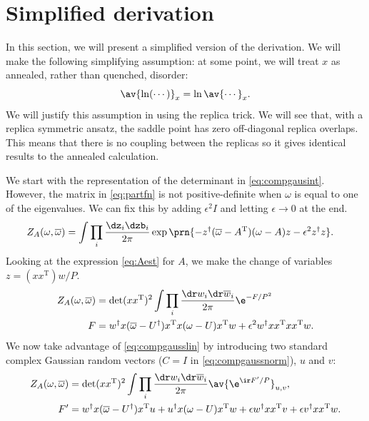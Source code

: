 \documentclass[12pt]{article}
\newcommand{\inv}{^{-1}}
\newcommand{\dg}{^\dagger}
\newcommand{\trans}{^\mathrm{T}}
\newcommand{\omb}{\overline{\omega}}
\newcommand{\dw}{\dr w}
\newcommand{\dwb}{\dr\overline{w}}
\begin{document}
\section{Simplified derivation}\label{sec:simplederiv}

In this section, we will present a simplified version of the derivation.
We will make the following simplifying assumption: at some point, we will treat $x$ as annealed, rather than quenched, disorder:
%
\begin{equation}\label{eq:annealed}
  \av{\ln (\cdots)}_x = \ln\av{\cdots}_x.
\end{equation}
%
We will justify this assumption in  using the replica trick.
We will see that, with a replica symmetric ansatz, the saddle point has zero off-diagonal replica overlaps.
This means that there is no coupling between the replicas so it gives identical results to the annealed calculation.

We start with the representation of the determinant in \eqref{eq:compgausint}.
However, the matrix in \eqref{eq:partfn} is not positive-definite when $\omega$ is equal to one of the eigenvalues.
We can fix this by adding $\epsilon^2I$ and letting $\epsilon\to0$ at the end.
%
\begin{equation}\label{eq:partfnintz}
\begin{aligned}
  Z_A(\omega,\omb) &= \int \prod_i\frac{\dz_i\dzb_i}{2\pi} \exp\prn{
    -z\dg (\omb-A\trans)(\omega-A) z - \epsilon^2 z\dg z} .%
\end{aligned}
\end{equation}
%
Looking at the expression \eqref{eq:Aest} for $A$, we make the change of variables $z=(xx\trans)w/P$.
%
\begin{equation}\label{eq:partfnintw}
\begin{aligned}
  Z_A(\omega,\omb) &= \det(xx\trans)^2 \int \prod_i\frac{\dw_i\dwb_i}{2\pi}\e^{-F/P^2}
    \\
  F &=
     w\dg x(\omb-U\dg)x\trans x(\omega-U)x\trans w + \epsilon^2 w\dg xx\trans xx\trans w .%
\end{aligned}
\end{equation}
%
We now take advantage of \eqref{eq:compgausslin} by introducing two standard complex Gaussian random vectors ($C=I$ in \eqref{eq:compgaussnorm}), $u$ and $v$:
%
\begin{equation}\label{eq:partfnintwuv}
\begin{aligned}
  Z_A(\omega,\omb) &= \det(xx\trans)^2 \int \prod_i\frac{\dw_i\dwb_i}{2\pi} \av{\e^{\ir F'/P}}_{u,v},\\
  F' &=
    w\dg x(\omb-U\dg)x\trans u + u\dg x(\omega-U)x\trans w + \epsilon w\dg xx\trans v + \epsilon v\dg xx\trans w .%
\end{aligned}
\end{equation}
%
\end{document}
